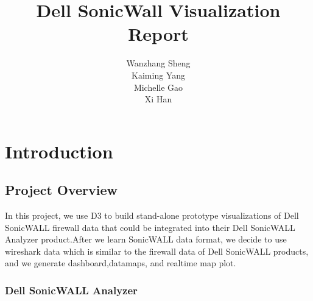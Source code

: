 \documentclass[paper=a4, fontsize=11pt]{report} %
\title{Dell SonicWall Visualization Report}
\author{
Wanzhang Sheng\\
Kaiming Yang\\
Michelle Gao\\
Xi Han
}
\begin{document}
\maketitle


\chapter{Introduction} %
\label{cha:introduction}

\section{Project Overview} %
\label{sec:project_overview}
In this project, we use D3 to build stand-alone prototype visualizations of Dell SonicWALL firewall
data that could be integrated into their Dell SonicWALL Analyzer product.After we learn SonicWALL
data format, we decide to  use wireshark data which is similar to the firewall data of Dell
SonicWALL products, and we generate dashboard,datamaps, and realtime map plot.

\subsection{Dell SonicWALL Analyzer} %
\label{sub:dell_sonicwall_analyzer}
\end{document}
